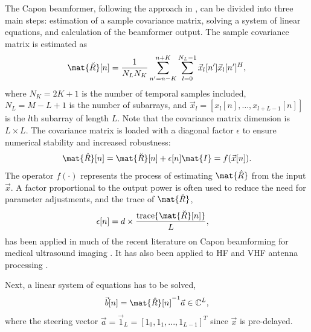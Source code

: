 The Capon beamformer, following the approach in \cite{Synnevag2009}, can be divided into three main steps: estimation of a sample covariance matrix, solving a system of linear equations, and calculation of the beamformer output.  The sample covariance matrix is estimated as 
%
\begin{align}
\mat{\breve{R}}[n] = \frac{1}{N_LN_K}\sum_{n'=n-K}^{n+K} \sum_{l=0}^{N_L-1} \vec{x}_l[n']\vec{x}_l[n']^H,\label{II_eq:R}
\end{align}
%
where  $N_K = 2K + 1$ is the number of temporal samples included, $N_L = M-L+1$ is the number of subarrays, and $\vec{x}_l = [x_l[n], \dotso, x_{l+L-1}[n]]$ is the $l\text{th}$ subarray of length $L$. Note that the covariance matrix dimension is $L \times L$. The covariance matrix is loaded with a diagonal factor $\epsilon$ to ensure numerical stability and increased robustness:
%
\begin{align}\label{II_eq:diag}
\mat{\hat{R}}[n] = \mat{\breve{R}}[n] + \epsilon[n]\mat{I} = f(\vec{x}[n]).
\end{align}
%
The operator $f(\cdot)$ represents the process of estimating $\mat{\hat{R}}$ from the input $\vec{x}$.
A factor proportional to the output power is often used to reduce the need for parameter adjustments, and the trace of $\mat{\breve{R}}$, 
%
\begin{align}\label{II_eq:diag_adapt}
\epsilon[n] &= d \times \frac{\text{trace}\{\mat{\breve{R}}[n]\}}{L},
\end{align}
%
has been applied in much of the recent literature on Capon beamforming for medical ultrasound imaging \cite{Synnevag2007, Nilsen2009, Wang2009, Mehdizadeh2012}. It has also been applied to HF and VHF antenna processing \cite{Featherstone1997}.

Next, a linear system of equations has to be solved,
%
\begin{align}\label{II_eq:b}
\vec{b}[n] = \mat{\hat{R}}[n]^{-1}\vec{a} \in \mathbb{C}^L,
\end{align}
%
where the steering vector $\vec{a} = \vec{1}_L = [1_0, 1_1, ..., 1_{L-1}]^T$ since $\vec{x}$ is pre-delayed. 

